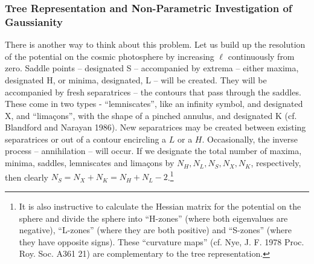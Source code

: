 \documentclass[psfig,11pt]{article}
\begin{document}
\subsubsection{Tree Representation and Non-Parametric Investigation of Gaussianity}
There is another way to think about this problem. Let us build up the resolution of the potential on the cosmic photosphere by increasing $\ell$ continuously from zero. Saddle points -- designated  S -- accompanied by extrema -- either maxima, designated H,  or minima, designated, L -- will be created. They will be accompanied by fresh separatrices -- the contours that pass through the saddles. These come in two types - ``lemniscates'', like an infinity symbol, and designated X, and ``lima\c cons'', with the shape of a pinched annulus, and designated K (cf. Blandford and Narayan 1986). New separatrices may be created between existing separatrices or out of a contour encircling a $L$ or a $H$.  Occasionally, the inverse process -- annihilation -- will occur. If we designate the total number of maxima, minima, saddles, lemniscates and lima\c cons by $N_H,N_L,N_S,N_X,N_K$, respectively, then clearly $N_S=N_X+N_K=N_H+N_L-2$.\footnote{It is also instructive to calculate the Hessian matrix for the potential on the sphere and divide the sphere into ``H-zones'' (where both eigenvalues are negative), ``L-zones'' (where they are both positive) and ``S-zones'' (where they have opposite signs). These ``curvature maps'' (cf. Nye, J. F. 1978 Proc. Roy. Soc. A361 21) are complementary to the tree representation.}
\end{document}
